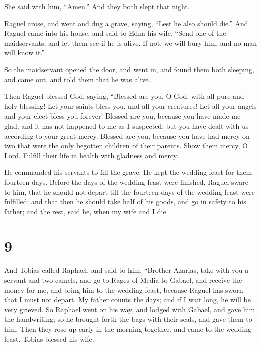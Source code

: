  She said with him, ``Amen.'' And they both slept that
night.

 Raguel arose, and went and dug a grave, 
saying, ``Lest he also should die.''  And Raguel came
into his house,  and said to Edna his wife, ``Send one of
the maidservants, and let them see if he is alive. If not, we will bury
him, and no man will know it.''

 So the maidservant opened the door, and went in, and
found them both sleeping,  and came out, and told them
that he was alive.

 Then Raguel blessed God, saying, ``Blessed are you, O
God, with all pure and holy blessing! Let your saints bless you, and all
your creatures! Let all your angels and your elect bless you forever!
 Blessed are you, because you have made me glad; and it
has not happened to me as I suspected; but you have dealt with us
according to your great mercy.  Blessed are you, because
you have had mercy on two that were the only begotten children of their
parents. Show them mercy, O Lord. Fulfill their life in health with
gladness and mercy.

 He commanded his servants to fill the grave.
 He kept the wedding feast for them fourteen days.
 Before the days of the wedding feast were finished,
Raguel sware to him, that he should not depart till the fourteen days of
the wedding feast were fulfilled;  and that then he
should take half of his goods, and go in safety to his father; and the
rest, said he, when my wife and I die.

\hypertarget{section-8}{%
\section{9}\label{section-8}}

 And Tobias called Raphael, and said to him,
 ``Brother Azarias, take with you a servant and two
camels, and go to Rages of Media to Gabael, and receive the money for
me, and bring him to the wedding feast,  because Raguel
has sworn that I must not depart.  My father counts the
days; and if I wait long, he will be very grieved.  So
Raphael went on his way, and lodged with Gabael, and gave him the
handwriting; so he brought forth the bags with their seals, and gave
them to him.  Then they rose up early in the morning
together, and came to the wedding feast. Tobias blessed his wife.

